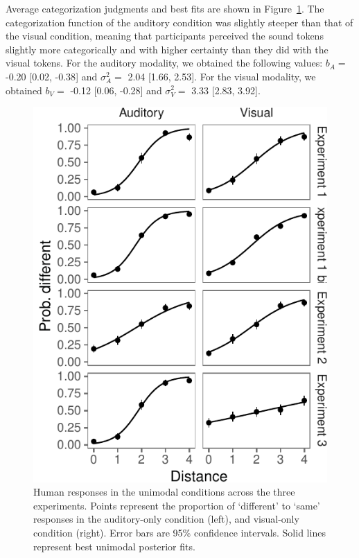 \documentclass[english,,man,floatsintext]{apa6}
\theoremstyle{definition}
\theoremstyle{definition}
\theoremstyle{definition}
\theoremstyle{remark}
\begin{document}
Average categorization judgments and best fits are shown in
Figure~\ref{fig:unimodal}. The categorization function of the auditory
condition was slightly steeper than that of the visual condition,
meaning that participants perceived the sound tokens slightly more
categorically and with higher certainty than they did with the visual
tokens. For the auditory modality, we obtained the following values:
\(b_A=\) -0.20 {[}0.02, -0.38{]} and \(\sigma^2_A=\) 2.04 {[}1.66,
2.53{]}. For the visual modality, we obtained \(b_V=\) -0.12 {[}0.06,
-0.28{]} and \(\sigma^2_V=\) 3.33 {[}2.83, 3.92{]}.

\begin{figure}[!h]
\includegraphics[width=\textwidth]{ms_files/figure-latex/unimodal-1} \caption{Human responses in the unimodal conditions across the three experiments. Points represent the proportion of `different' to `same' responses in the auditory-only condition (left), and visual-only condition (right). Error bars are 95\% confidence intervals. Solid lines represent best unimodal posterior fits.}\label{fig:unimodal}
\end{figure}
\end{document}
